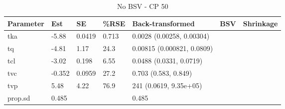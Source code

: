 \begin{table}
\centering\centering
\caption{No BSV - CP 50}
\centering
\fontsize{8}{10}\selectfont
\begin{tabular}[t]{lllllll}
\toprule
\textbf{Parameter} & \textbf{Est} & \textbf{SE} & \textbf{\%RSE} & \textbf{Back-transformed} & \textbf{BSV} & \textbf{Shrinkage}\\
\midrule
tka & -5.88 & 0.0419 & 0.713 & 0.0028 (0.00258, 0.00304) &  & \\
\midrule
tq & -4.81 & 1.17 & 24.3 & 0.00815 (0.000821, 0.0809) &  & \\
\midrule
tcl & -3.02 & 0.198 & 6.55 & 0.0488 (0.0331, 0.0719) &  & \\
\midrule
tvc & -0.352 & 0.0959 & 27.2 & 0.703 (0.583, 0.849) &  & \\
\midrule
tvp & 5.48 & 4.22 & 76.9 & 241 (0.0619, 9.35e+05) &  & \\
\midrule
prop.sd & 0.485 &  &  & 0.485 &  & \\
\bottomrule
\end{tabular}
\end{table}